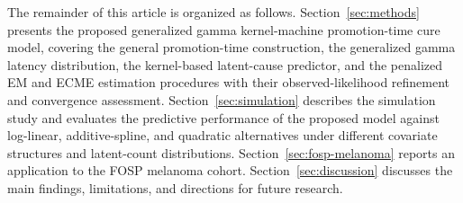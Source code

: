 The remainder of this article is organized as follows. Section~\ref{sec:methods}
presents the proposed generalized gamma kernel-machine promotion-time cure
model, covering the general promotion-time construction, the generalized gamma
latency distribution, the kernel-based latent-cause predictor, and the penalized
EM and ECME estimation procedures with their observed-likelihood refinement and
convergence assessment. Section~\ref{sec:simulation} describes the simulation
study and evaluates the predictive performance of the proposed model against
log-linear, additive-spline, and quadratic alternatives under different
covariate structures and latent-count distributions.
Section~\ref{sec:fosp-melanoma} reports an application to the FOSP melanoma
cohort.
Section~\ref{sec:discussion} discusses the main findings, limitations, and
directions for future research.
